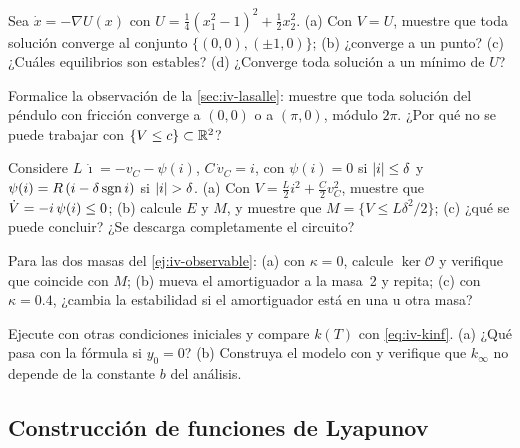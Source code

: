 \begin{problema}\label{prob:iv-gradiente}
Sea $\dot x=-\nabla U(x)$ con $U=\tfrac14(x_1^2-1)^2+\tfrac12x_2^2$. (a) Con $V=U$, muestre que toda solución converge al conjunto $\{(0,0),(\pm1,0)\}$; (b) ¿converge a un punto? (c) ¿Cuáles equilibrios son estables? (d) ¿Converge toda solución a un mínimo de $U$?
\end{problema}

\begin{problema}\label{prob:iv-cilindro}
Formalice la observación de la \cref{sec:iv-lasalle}: muestre que toda solución del péndulo con fricción converge a $(0,0)$ o a $(\pi,0)$, módulo $2\pi$. ¿Por qué no se puede trabajar con $\{V\le c\}\subset\mathbb{R}^2$?
\end{problema}

\begin{problema}\label{prob:iv-rlc}
Considere $L\,\dot\imath=-v_C-\psi(i)$, $C\,\dot v_C=i$, con $\psi(i)=0$ si $\left\lvert i\right\rvert\le\delta$ y $\psi(i)=R\,(i-\delta\operatorname{sgn} i)$ si $\left\lvert i\right\rvert>\delta$. (a) Con $V=\tfrac L2i^2+\tfrac C2v_C^2$, muestre que $\dot V=-i\,\psi(i)\le0$; (b) calcule $E$ y $M$, y muestre que $M=\{V\le L\delta^2/2\}$; (c) ¿qué se puede concluir? ¿Se descarga completamente el circuito?
\end{problema}

\begin{problema}\label{prob:iv-masas}
\etiquetaM{} Para las dos masas del \cref{ej:iv-observable}: (a) con $\kappa=0$, calcule $\ker\mathcal O$ y verifique que coincide con $M$; (b) mueva el amortiguador a la masa~2 y repita; (c) con $\kappa=0.4$, ¿cambia la estabilidad si el amortiguador está en una u otra masa?
\end{problema}

\begin{problema}\label{prob:iv-adaptativo}
\etiquetaM{} Ejecute  con otras condiciones iniciales y compare $k(T)$ con \eqref{eq:iv-kinf}. (a) ¿Qué pasa con la fórmula si $y_0=0$? (b) Construya el modelo con  y verifique que $k_\infty$ no depende de la constante $b$ del análisis.
\end{problema}

\subsection*{Construcción de funciones de Lyapunov}

